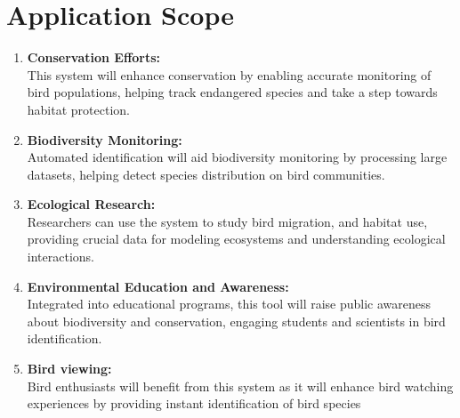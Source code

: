 \section{Application Scope}
\begin{enumerate}
    \item \textbf{Conservation Efforts:}\\This system will enhance conservation
          by enabling accurate monitoring
          of bird populations, helping track endangered species and take a step
          towards habitat protection.
    \item \textbf{Biodiversity Monitoring:}\\Automated identification will aid
          biodiversity monitoring by
          processing large datasets, helping detect species distribution on
          bird communities.
    \item \textbf{Ecological Research:}\\ Researchers can use the system to
          study bird migration,
          and habitat use, providing crucial data for modeling ecosystems and
          understanding ecological interactions.
    \item \textbf{Environmental Education and Awareness:}\\Integrated into
          educational programs, this tool will
          raise public awareness about biodiversity and conservation, engaging
          students and scientists in bird identification.
    \item \textbf{Bird viewing:}\\Bird enthusiasts will benefit from this
          system as it will enhance bird watching
          experiences by providing instant identification of bird species
\end{enumerate}
